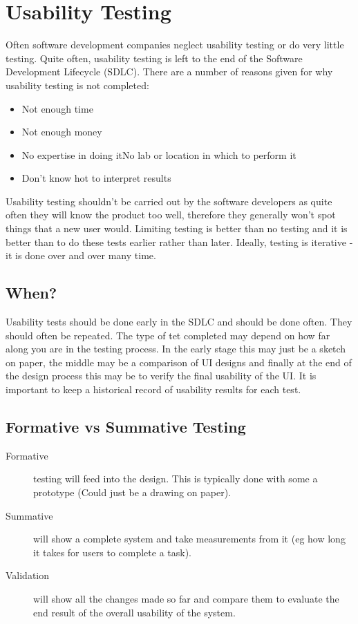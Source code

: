 
\section*{Usability Testing}

Often software development companies neglect usability testing or do very little testing. Quite often, usability testing is left to the end of the Software Development Lifecycle (SDLC). There are a number of reasons given for why usability testing is not completed:
\begin{itemize}
    \item Not enough time
    \item Not enough money
    \item No expertise in doing itNo lab or location in which to perform it
    \item Don't know hot to interpret results
\end{itemize}

Usability testing shouldn't be carried out by the software developers as quite often they will know the product too well, therefore they generally won't spot things that a new user would. Limiting testing is better than no testing and it is better than to do these tests earlier rather than later. Ideally, testing is iterative - it is done over and over many time. 

\subsection*{When?}
Usability tests should be done early in the SDLC and should be done often. They should often be repeated. The type of tet completed may depend on how far along you are in the testing process. In the early stage this may just be a sketch on paper, the middle may be a comparison of UI designs and finally at the end of the design process this may be to verify the final usability of the UI.
It is important to keep a historical record of usability results for each test. 

\subsection*{Formative vs Summative Testing}
\begin{description}
    \item[Formative] testing will feed into the design. This is typically done with some a prototype (Could just be a drawing on paper).
    \item[Summative] will show a complete system and take measurements from it (eg how long it takes for users to complete a task). 
    \item[Validation] will show all the changes made so far and compare them to evaluate the end result of the overall usability of the system. 
\end{description}

